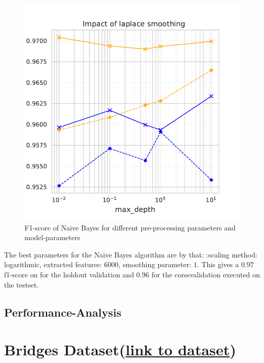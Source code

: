 \documentclass[11pt]{article}
\begin{document}
\begin{figure}
\begin{minipage}[l]{0.3\textwidth}
\end{minipage}
\begin{minipage}[l]{0.3\textwidth}
\includegraphics[width=1\linewidth]{email_spam/nb_smoother.pdf}
\end{minipage}
   \caption{F1-score of Naive Bayes for different pre-processing parameters and model-parameters}
\label{spamfig_fig3}
\end{figure}

The best parameters for the Naive Bayes algorithm are by that: :scaling method: logarithmic, extracted features: $6000$, smoothing parameter: $1$. This gives a $0.97$ f1-score on for the holdout validation and $0.96$ for the corssvalidation executed on the testset.


\subsection{Performance-Analysis}


\section{Bridges Dataset(\href{https://archive.ics.uci.edu/ml/datasets/Pittsburgh+Bridges}{link to dataset})}
\end{document}
